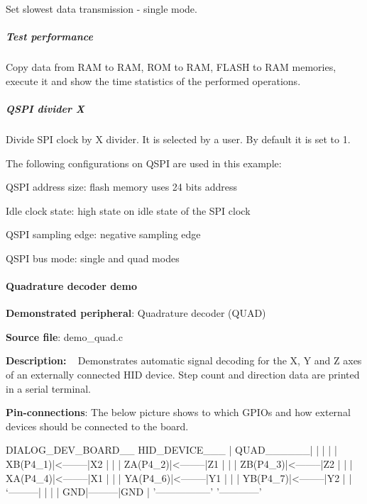 Set slowest data transmission -\/ single mode.

\subparagraph*{Test performance}

Copy data from R\+A\+M to R\+A\+M, R\+O\+M to R\+A\+M, F\+L\+A\+S\+H to R\+A\+M memories, execute it and show the time statistics of the performed operations.

\subparagraph*{Q\+S\+P\+I divider X}

Divide S\+P\+I clock by X divider. It is selected by a user. By default it is set to 1.

The following configurations on Q\+S\+P\+I are used in this example\+:
\begin{DoxyItemize}
\item Q\+S\+P\+I address size\+: flash memory uses 24 bits address
\item Idle clock state\+: high state on idle state of the S\+P\+I clock
\item Q\+S\+P\+I sampling edge\+: negative sampling edge
\item Q\+S\+P\+I bus mode\+: single and quad modes
\end{DoxyItemize}

\paragraph*{Quadrature decoder demo}


\begin{DoxyItemize}
\item {\bfseries Demonstrated peripheral}\+: Quadrature decoder (Q\+U\+A\+D)
\item {\bfseries Source file}\+: demo\+\_\+quad.\+c
\item {\bfseries Description\+:} ~\newline
 Demonstrates automatic signal decoding for the X, Y and Z axes of an externally connected H\+I\+D device. Step count and direction data are printed in a serial terminal.
\item {\bfseries Pin-\/connections}\+: The below picture shows to which G\+P\+I\+Os and how external devices should be connected to the board.
\end{DoxyItemize}


\begin{DoxyPre}
   DIALOG\_DEV\_BOARD\_\_          HID\_DEVICE\_\_\_
   |       QUAD\_\_\_\_\_\_|         |            |
   |       | XB(P4\_1)|<--------|X2          |
   |       | ZA(P4\_2)|<--------|Z1          |
   |       | ZB(P4\_3)|<--------|Z2          |
   |       | XA(P4\_4)|<--------|X1          |
   |       | YA(P4\_6)|<--------|Y1          |
   |       | YB(P4\_7)|<--------|Y2          |
   |       `---------|         |            |
   |              GND|---------|GND         |
   '-----------------'         '------------'
\end{DoxyPre}



